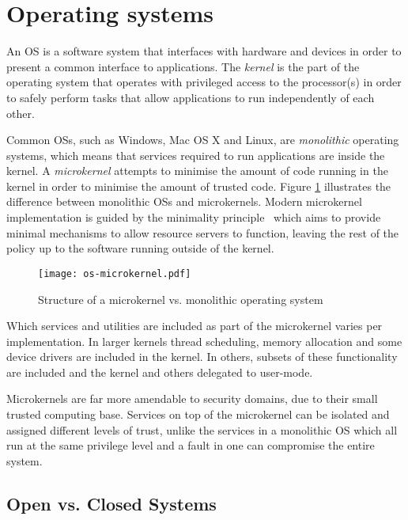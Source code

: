 \section{Operating systems}
\label{sec:background-operating-systems}

An \gls{OS} is a software system that interfaces with hardware and devices in order to present a common interface to applications.
The \emph{kernel} is the part of the operating system that operates with privileged access to the processor(s) in order to safely perform tasks that allow applications to run independently of each other.

Common \glspl{OS}, such as Windows, Mac OS X and Linux, are \emph{monolithic} operating systems, which means that services required to run applications are inside the kernel.
A \emph{microkernel} attempts to minimise the amount of code running in the kernel in order to minimise the amount of trusted code.
Figure \ref{fig:os-microkernel} illustrates the difference between monolithic \glspl{OS} and microkernels.
Modern microkernel implementation is guided by the minimality principle~\citep{Liedtke_95} which aims to provide minimal mechanisms to allow resource servers to function, leaving the rest of the policy up to the software running outside of the kernel.

\begin{figure}[tb]
	\begin{center}
		\leavevmode
		\texttt{[image: os-microkernel.pdf]}
		\caption{Structure of a microkernel vs. monolithic operating system}
		\label{fig:os-microkernel}
	\end{center}
\end{figure}

Which services and utilities are included as part of the microkernel varies per implementation. In
larger kernels thread scheduling, memory allocation and some device drivers are included in the kernel.
In others, subsets of these functionality are included and the kernel and others delegated to
user-mode. 

Microkernels are far more amendable to security domains, due to their small trusted computing base.
Services on top of the microkernel can be isolated and assigned different levels of trust, unlike
the services in a monolithic \gls{OS} which all run at the same privilege level and a fault in one
can compromise the entire system. 

\subsection{Open vs. Closed Systems}

